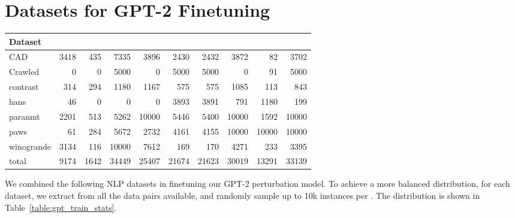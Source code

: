 \section{Datasets for GPT-2 Finetuning}
\label{appendix:train_data}

\begin{table*}
\small
\centering
\setlength{\tabcolsep}{3.5pt}
\begin{tabular}{lrrrrrrrrr}
\toprule
\textbf{Dataset} & \textbf{\ctrltag{negation}} & \textbf{\ctrltag{quantifier}} & \textbf{\ctrltag{leixcal}} & \textbf{\ctrltag{resemantic}} & \textbf{\ctrltag{insert}} & \textbf{\ctrltag{delete}} & \textbf{\ctrltag{restructure}} & \textbf{\ctrltag{shuffle}} & \emph{\ctrltag{global}} \\ 
\midrule
        CAD &      3418 &         435 &     7335 &        3896 &    2430 &    2432 &         3872 &       82 &    3702 \\
    Crawled &         0 &           0 &     5000 &           0 &    5000 &    5000 &            0 &       91 &    5000 \\
   contrast &       314 &         294 &     1180 &        1167 &     575 &     575 &         1085 &      113 &     843 \\
       hans &        46 &           0 &        0 &           0 &    3893 &    3891 &          791 &     1180 &     199 \\
    paranmt &      2201 &         513 &     5262 &       10000 &    5446 &    5400 &        10000 &     1592 &   10000 \\
       paws &        61 &         284 &     5672 &        2732 &    4161 &    4155 &        10000 &    10000 &   10000 \\
 winogrande &      3134 &         116 &    10000 &        7612 &     169 &     170 &         4271 &      233 &    3395 \\
      total &      9174 &        1642 &    34449 &       25407 &   21674 &   21623 &        30019 &    13291 &   33139 \\
\bottomrule
\end{tabular}
\caption{The datasets used for finetuning the GPT-2 perturbation model, and the \tagstr distributions.}
\label{table:gpt_train_stats}
\end{table*}


We combined the following NLP datasets in finetuning our GPT-2 perturbation model.
To achieve a more balanced distribution, for each dataset, we extract \tagstrs from all the data pairs available, and randomly sample up to 10k instances per \tagstr.
The distribution is shown in Table~\ref{table:gpt_train_stats}.

